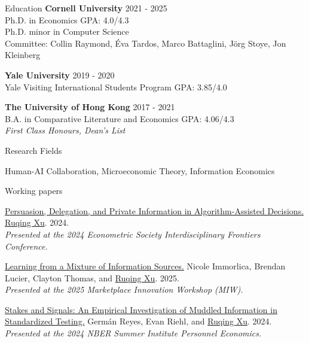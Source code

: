 \documentclass{resume} %
\begin{document}

\begin{rSection}{Education}
{\bf Cornell University} \hfill {2021 - 2025} 
\\ Ph.D. in Economics \hfill {GPA: 4.0/4.3} \\
Ph.D. minor in Computer Science \hfill 
\\ Committee: Collin Raymond, \'{E}va Tardos, Marco Battaglini, J\"{o}rg Stoye, Jon Kleinberg\hfill

{\bf Yale University} \hfill {2019 - 2020} 
\\ Yale Visiting International Students Program \hfill {GPA: 3.85/4.0}

{\bf The University of Hong Kong} \hfill {2017 - 2021} 
\\ B.A. in Comparative Literature and Economics \hfill {GPA: 4.06/4.3}
\\ \emph{First Class Honours, Dean's List}

\end{rSection}

\begin{rSection}{Research Fields} \itemsep -10pt
\item Human-AI Collaboration, Microeconomic Theory, Information Economics
\end{rSection}

\begin{rSection}{Working papers}

  \href{https://ruqing-xu.github.io/assets/pdf/delegation_xu.pdf}{Persuasion, Delegation, and Private Information in Algorithm-Assisted Decisions.} \underline{Ruqing Xu}. 2024. \\
 \emph{Presented at the 2024 Econometric Society Interdisciplinary Frontiers Conference.}

\href{https://ruqing-xu.github.io/assets/pdf/LearningfromMixture.pdf}{Learning from a Mixture of Information Sources.} Nicole Immorlica, Brendan Lucier, Clayton Thomas, and \underline{Ruqing Xu}. 2025.\\
\emph{Presented at the 2025 Marketplace Innovation Workshop (MIW).}

\href{https://ruqing-xu.github.io/assets/pdf/rrx_stakes_june2024.pdf}{Stakes and Signals: An Empirical Investigation of Muddled
Information in Standardized Testing.} Germán Reyes, Evan Riehl, and \underline{Ruqing Xu}. 2024. \\
\emph{Presented at the 2024 NBER Summer Institute Personnel Economics.}



\end{rSection}
\end{document}
